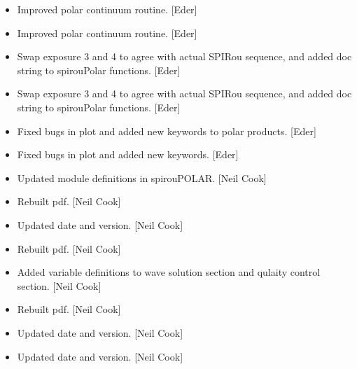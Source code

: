 \documentclass[a4paper,10pt,english]{report}
\begin{document}
\begin{itemize}
\item {} 
Improved polar continuum routine. {[}Eder{]}

\item {} 
Improved polar continuum routine. {[}Eder{]}

\item {} 
Swap exposure 3 and 4 to agree with actual SPIRou sequence, and added
doc string to spirouPolar functions. {[}Eder{]}

\item {} 
Swap exposure 3 and 4 to agree with actual SPIRou sequence, and added
doc string to spirouPolar functions. {[}Eder{]}

\item {} 
Fixed bugs in plot and added new keywords to polar products. {[}Eder{]}

\item {} 
Fixed bugs in plot and added new keywords. {[}Eder{]}

\item {} 
Updated module definitions in spirouPOLAR. {[}Neil Cook{]}

\item {} 
Rebuilt pdf. {[}Neil Cook{]}

\item {} 
Updated date and version. {[}Neil Cook{]}

\item {} 
Rebuilt pdf. {[}Neil Cook{]}

\item {} 
Added variable definitions to wave solution section and qulaity
control section. {[}Neil Cook{]}

\item {} 
Rebuilt pdf. {[}Neil Cook{]}

\item {} 
Updated date and version. {[}Neil Cook{]}

\item {} 
Updated date and version. {[}Neil Cook{]}

\end{itemize}
\end{document}
